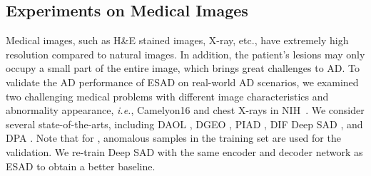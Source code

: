 \documentclass{bmvc2k}
\begin{document}
\subsection{Experiments on Medical Images}\label{sec:medical}
Medical images, such as H\&E stained images, X-ray, etc., have extremely high resolution compared to natural images. In addition, the patient's lesions may only occupy a small part of the entire image, which brings great challenges to AD. To validate the AD performance of ESAD on real-world AD scenarios, we examined two challenging medical problems with different image characteristics and abnormality appearance, \emph{i.e.}, Camelyon16 \cite{bejnordi2017diagnostic} and chest X-rays in NIH~\cite{wang2017chestx}. 
We consider several state-of-the-arts, including DAOL \cite{tang2019deep}, DGEO \cite{golan2018deep}, PIAD \cite{tuluptceva2019perceptual}, DIF \cite{ouardini2019towards} Deep SAD \cite{SAD}, and DPA \cite{tuluptceva2020anomaly}. Note that for
\cite{golan2018deep,tuluptceva2019perceptual,ouardini2019towards}, anomalous samples in the training set are used for the validation. We re-train Deep SAD \cite{SAD} with the same encoder and decoder network as ESAD to obtain a better baseline.

\renewcommand \arraystretch{0.95}
\begin{table}[t]
\centering
\caption{Performance of anomaly detection methods on medical image datasets. We report the avg. AUC in \% with st. dev. computed over 3 runs.}
\label{tal:medical}
\footnotesize
{}
\vspace{-8pt}
\end{table}
\end{document}
